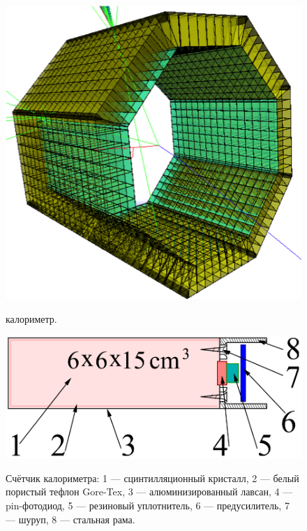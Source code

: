 \begin{figure}[htbp]
    \begin{minipage}[t]{0.35\textwidth}
        \centering
        \includegraphics[width=\textwidth]{img/cmd3_detector/csi_scketch.png}
        \label{fig:lxe_sketch}
        \caption{ калориметр.}
    \end{minipage}
    \qquad
    \begin{minipage}[t]{0.60\textwidth}
        \centering
        \includegraphics[width=.9\textwidth]{img/cmd3_detector/csi_crystal_scheme_v2.png}
        \label{lxe_electrode_structure}
        \caption{Счётчик  калориметра:
        1 --- сцинтилляционный кристалл,
        2 --- белый пористый тефлон Gore-Tex,
        3 --- алюминизированный лавсан,
        4 --- pin-фотодиод,
        5 --- резиновый уплотнитель,
        6 --- предусилитель,
        7 --- шуруп,
        8 --- стальная рама.}
  \end{minipage}
\end{figure}


